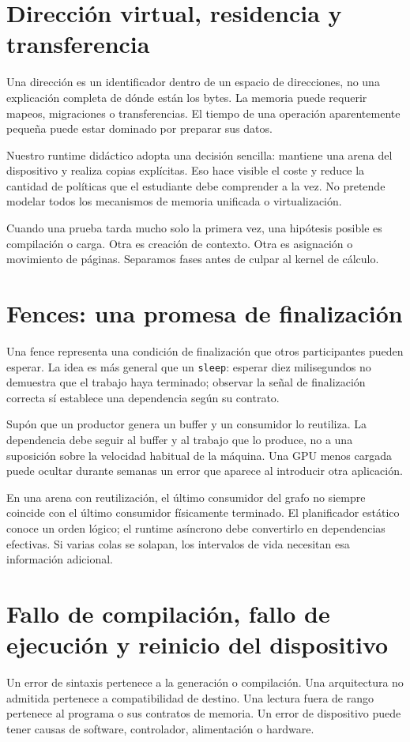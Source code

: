 \documentclass[12pt,a4paper,oneside]{report}
\begin{document}
\section{Dirección virtual, residencia y transferencia}
Una dirección es un identificador dentro de un espacio de direcciones, no una explicación completa de dónde están los bytes. La memoria puede requerir mapeos, migraciones o transferencias. El tiempo de una operación aparentemente pequeña puede estar dominado por preparar sus datos.

Nuestro runtime didáctico adopta una decisión sencilla: mantiene una arena del dispositivo y realiza copias explícitas. Eso hace visible el coste y reduce la cantidad de políticas que el estudiante debe comprender a la vez. No pretende modelar todos los mecanismos de memoria unificada o virtualización.

Cuando una prueba tarda mucho solo la primera vez, una hipótesis posible es compilación o carga. Otra es creación de contexto. Otra es asignación o movimiento de páginas. Separamos fases antes de culpar al kernel de cálculo.

\section{Fences: una promesa de finalización}
Una fence representa una condición de finalización que otros participantes pueden esperar. La idea es más general que un \texttt{sleep}: esperar diez milisegundos no demuestra que el trabajo haya terminado; observar la señal de finalización correcta sí establece una dependencia según su contrato.

Supón que un productor genera un buffer y un consumidor lo reutiliza. La dependencia debe seguir al buffer y al trabajo que lo produce, no a una suposición sobre la velocidad habitual de la máquina. Una GPU menos cargada puede ocultar durante semanas un error que aparece al introducir otra aplicación.

En una arena con reutilización, el último consumidor del grafo no siempre coincide con el último consumidor físicamente terminado. El planificador estático conoce un orden lógico; el runtime asíncrono debe convertirlo en dependencias efectivas. Si varias colas se solapan, los intervalos de vida necesitan esa información adicional.

\section{Fallo de compilación, fallo de ejecución y reinicio del dispositivo}
Un error de sintaxis pertenece a la generación o compilación. Una arquitectura no admitida pertenece a compatibilidad de destino. Una lectura fuera de rango pertenece al programa o sus contratos de memoria. Un error de dispositivo puede tener causas de software, controlador, alimentación o hardware.
\end{document}
